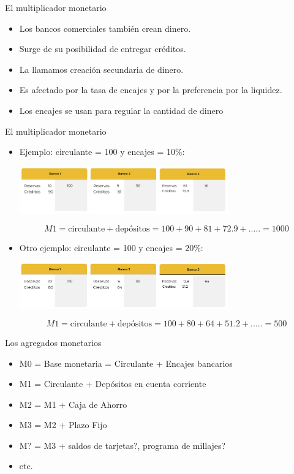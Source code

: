 \documentclass{beamer}
\begin{document}
\begin{frame}{El multiplicador monetario}
    \begin{itemize}
        \item Los bancos comerciales también crean dinero.
        \item Surge de su posibilidad de entregar créditos.
        \item La llamamos creación secundaria de dinero.
        \item Es afectado por la tasa de encajes y por la preferencia por la liquidez.
        \item Los encajes se usan para regular la cantidad de dinero
    \end{itemize}
\end{frame}

\begin{frame}{El multiplicador monetario}
    \begin{itemize}
        \item Ejemplo:  circulante = 100  y  encajes = 10\%:

        \begin{center}
            \includegraphics[width=9cm]{../Figures/C37.15.png}
    
            \[M1 = \text{circulante} + \text{depósitos} = 100 + 90 + 81 + 72.9 + ..... = 1000 \]
        \end{center}
        \item Otro ejemplo:  circulante = 100  y  encajes = 20\%:
            
        \begin{center}
            \includegraphics[width=9cm]{../Figures/C37.16.png}
    
            \[M1 = \text{circulante} + \text{depósitos} = 100 + 80 + 64 + 51.2 + ..... = 500 \]
        \end{center}
    \end{itemize}
\end{frame}


\begin{frame}{Los agregados monetarios}
    \begin{itemize}
        \item M0 = Base monetaria = Circulante + Encajes bancarios
        \item M1 = Circulante + Depósitos en cuenta corriente
        \item M2 = M1 + Caja de Ahorro
        \item M3 = M2 + Plazo Fijo
        \item M? = M3 + saldos de tarjetas?, programa de millajes? 
        \item etc.
    \end{itemize}
\end{frame}
\end{document}
